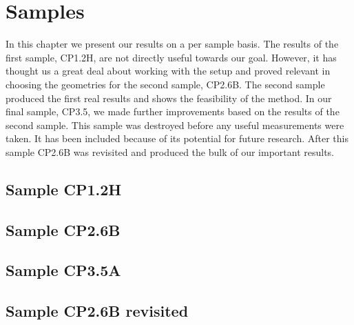 \chapter{Samples}
In this chapter we present our results on a per sample basis. The results of the first sample, CP1.2H, are not directly useful towards our goal. However, it has thought us a great deal about working with the setup and proved relevant in choosing the geometries for the second sample, CP2.6B. The second sample produced the first real results and shows the feasibility of the method. In our final sample, CP3.5, we made further improvements based on the results of the second sample. This sample was destroyed before any useful measurements were taken. It has been included because of its potential for future research. After this sample CP2.6B was revisited and produced the bulk of our important results.

\section{Sample CP1.2H}


\section{Sample CP2.6B}


\section{Sample CP3.5A}


\section{Sample CP2.6B revisited}
